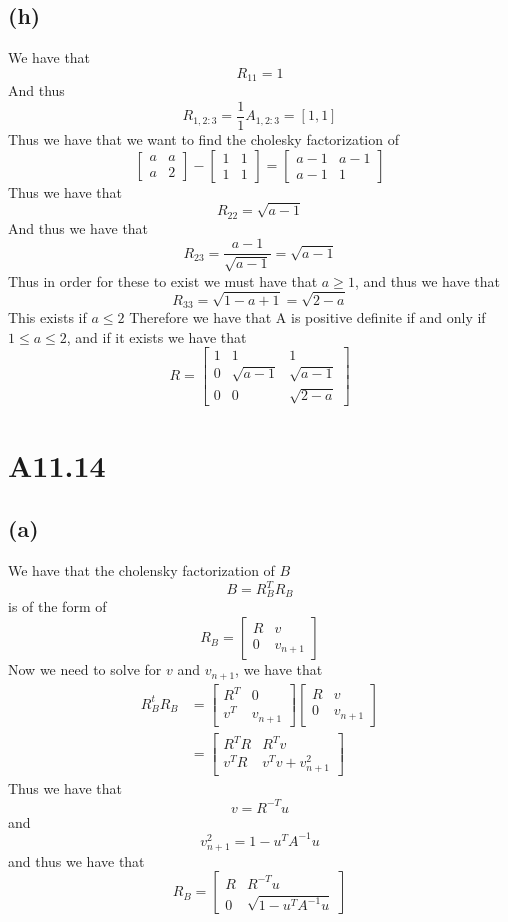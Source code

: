 \subsection*{(h)}
We have that 
$$R_11=1$$
And thus
$$R_{1,2:3}=\frac{1}{1}A_{1,2:3}=[1,1]$$
Thus we have that we want to find the cholesky factorization of
$$\begin{bmatrix}
    a & a\\
    a & 2
\end{bmatrix}-\begin{bmatrix}
    1 & 1\\
    1 & 1
\end{bmatrix}=\begin{bmatrix}
    a-1 & a-1\\
    a-1 & 1
\end{bmatrix}$$
Thus we have that
$$R_{22}=\sqrt{a-1}$$
And thus we have that
$$R_{23}=\frac{a-1}{\sqrt{a-1}}=\sqrt{a-1}$$
Thus in order for these to exist we must have that $a\geq 1$, and thus we have
that 
$$R_{33}=\sqrt{1-a+1}=\sqrt{2-a}$$
This exists if $a\leq 2$ Therefore we have that 
A is positive definite if and only if $1\leq a\leq 2$, and if it exists we have
that 
$$R=\begin{bmatrix}
    1 & 1 & 1\\
    0 & \sqrt{a-1} & \sqrt{a-1}\\
    0 & 0 & \sqrt{2-a}
\end{bmatrix}$$
\section*{A11.14}
\subsection*{(a)}
We have that the cholensky factorization of $B$
$$B=R_B^T R_B$$
is of the form of  
$$R_B=\begin{bmatrix}
    R & v\\
    0 & v_{n+1}
\end{bmatrix}$$
Now we need to solve for $v$ and $v_{n+1}$, we have that
\begin{align*}
R_B^t R_B&=\begin{bmatrix}
    R^T & 0\\
    v^T & v_{n+1}
\end{bmatrix}\begin{bmatrix}
    R & v\\
    0 & v_{n+1}
\end{bmatrix}\\
&=\begin{bmatrix}
    R^T R & R^Tv\\
    v^TR & v^Tv+v_{n+1}^2
\end{bmatrix}
\end{align*}
Thus we have that 
$$v=R^{-T}u$$
and 
$$v_{n+1}^2=1-u^TA^{-1}u$$
and thus we have that
$$\boxed{
    R_B=\begin{bmatrix}
        R & R^{-T}u\\
        0 & \sqrt{1-u^TA^{-1}u}
    \end{bmatrix}
}$$
